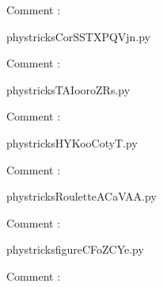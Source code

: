     Comment : 

    \clearpage
    


    \newcommand{\CaptionFigCorSSTXPQVjn}{<+Type your caption here+>}
    \begin{center}
        
    \end{center}
    phystricksCorSSTXPQVjn.py

    Comment : 

    \clearpage
    


    \newcommand{\CaptionFigTAIooroZRs}{<+Type your caption here+>}
    \begin{center}
        
    \end{center}
    phystricksTAIooroZRs.py

    Comment : 

    \clearpage
    


    \newcommand{\CaptionFigHYKooCotyT}{<+Type your caption here+>}
    \begin{center}
        
    \end{center}
    phystricksHYKooCotyT.py

    Comment : 

    \clearpage
    


    \newcommand{\CaptionFigRouletteACaVAA}{<+Type your caption here+>}
    \begin{center}
        
    \end{center}
    phystricksRouletteACaVAA.py

    Comment : 

    \clearpage
    


    \newcommand{\CaptionFigfigureCFoZCYe}{<+Type your caption here+>}
    \begin{center}
        
    \end{center}
    phystricksfigureCFoZCYe.py

    Comment : 

    \clearpage
    

